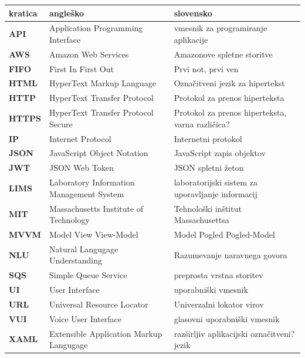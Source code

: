 \documentclass[a4paper, 12pt]{book}
\newcommand{\clearemptydoublepage}{\newpage{\pagestyle{empty}\cleardoublepage}}
\begin{document}
\noindent\begin{tabular}{p{}|p{}|p{}}    %
  {\bf kratica} & {\bf angleško}                             & {\bf slovensko} \\ \hline
  {\bf API} & Application Programming Interface & vmesnik za programiranje aplikacije \\
  {\bf AWS} & Amazon Web Services & Amazonove spletne storitve \\
  {\bf FIFO} & First In First Out & Prvi not, prvi ven \\
  {\bf HTML} & HyperText Markup Language & Označitveni jezik za hipertekst \\
  {\bf HTTP} & HyperText Transfer Protocol & Protokol za prenos hiperteksta \\
  {\bf HTTPS} & HyperText Transfer Protocol Secure & Protokol za prenos hiperteksta, varna različica? \\
  {\bf IP} & Internet Protocol & Internetni protokol \\
  {\bf JSON} & JavaScript Object Notation & JavaScript zapis objektov\\
  {\bf JWT} & JSON Web Token & JSON spletni žeton \\
  {\bf LIMS} & Laboratory Information Management System & laboratorijski sistem za uporavljanje informacij \\
  {\bf MIT} & Massachusetts Institute of Technology & Tehnološki inštitut Massachusettsa \\
  {\bf MVVM} & Model View View-Model & Model Pogled Pogled-Model \\
  {\bf NLU} & Natural Langugage Understanding & Razumevanje naravnega govora \\
  {\bf SQS} & Simple Queue Service & preprosta vrstna storitev \\
  {\bf UI} & User Interface & uporabniški vmesnik \\
  {\bf URL} & Universal Resource Locator & Univerzalni lokator virov \\
  {\bf VUI} & Voice User Interface & glasovni uporabniški vmesnik \\
  {\bf XAML} & Extensible Application Markup Langugage & razširljiv aplikacijski označitveni? jezik \\
\end{tabular}


\clearemptydoublepage
\end{document}
